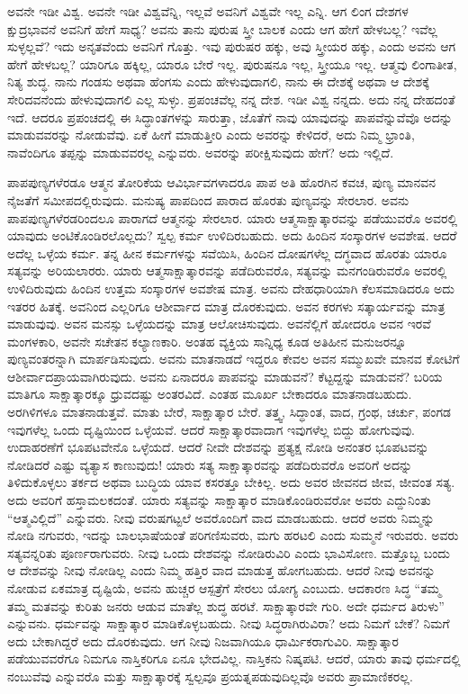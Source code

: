 ಅವನೇ ಇಡೀ ವಿಶ್ವ. ಅವನೇ ಇಡೀ ವಿಶ್ವವೆನ್ನಿ, ಇಲ್ಲವೆ ಅವನಿಗೆ ವಿಶ್ವವೇ ಇಲ್ಲ ಎನ್ನಿ. ಆಗ ಲಿಂಗ ದೇಶಗಳ ಕ್ಷುದ್ರಭಾವನೆ ಅವನಿಗೆ ಹೇಗೆ ಸಾಧ್ಯ? ಅವನು ತಾನು ಪುರುಷ ಸ್ತ್ರೀ ಬಾಲಕ ಎಂದು ಆಗ ಹೇಗೆ ಹೇಳಬಲ್ಲ? ಇವೆಲ್ಲ ಸುಳ್ಳಲ್ಲವೆ? ಇದು ಅನೃತವೆಂದು ಅವನಿಗೆ ಗೊತ್ತು. ಇವು ಪುರುಷರ ಹಕ್ಕು, ಅವು ಸ್ತ್ರೀಯರ ಹಕ್ಕು, ಎಂದು ಅವನು ಆಗ ಹೇಗೆ ಹೇಳಬಲ್ಲ? ಯಾರಿಗೂ ಹಕ್ಕಿಲ್ಲ, ಯಾರೂ ಬೇರೆ ಇಲ್ಲ. ಪುರುಷನೂ ಇಲ್ಲ, ಸ್ತ್ರೀಯೂ ಇಲ್ಲ. ಆತ್ಮವು ಲಿಂಗಾತೀತ, ನಿತ್ಯ ಶುದ್ಧ. ನಾನು ಗಂಡಸು ಅಥವಾ ಹೆಂಗಸು ಎಂದು ಹೇಳುವುದಾಗಲಿ, ನಾನು ಈ ದೇಶಕ್ಕೆ ಅಥವಾ ಆ ದೇಶಕ್ಕೆ ಸೇರಿದವನೆಂದು ಹೇಳುವುದಾಗಲಿ ಎಲ್ಲ ಸುಳ್ಳು. ಪ್ರಪಂಚವೆಲ್ಲ ನನ್ನ ದೇಶ. ಇಡೀ ವಿಶ್ವ ನನ್ನದು. ಅದು ನನ್ನ ದೇಹದಂತೆ ಇದೆ. ಆದರೂ ಪ್ರಪಂಚದಲ್ಲಿ ಈ ಸಿದ್ಧಾಂತಗಳನ್ನು ಸಾರುತ್ತಾ, ಜೊತೆಗೆ ನಾವು ಯಾವುದನ್ನು ಪಾಪವೆನ್ನುವೆವೊ ಅದನ್ನು ಮಾಡುವವರನ್ನು ನೋಡುವೆವು. ಏಕೆ ಹೀಗೆ ಮಾಡುತ್ತೀರಿ ಎಂದು ಅವರನ್ನು ಕೇಳಿದರೆ, ಅದು ನಿಮ್ಮ ಭ್ರಾಂತಿ, ನಾವೆಂದಿಗೂ ತಪ್ಪನ್ನು ಮಾಡುವವರಲ್ಲ ಎನ್ನುವರು. ಅವರನ್ನು ಪರೀಕ್ಷಿಸುವುದು ಹೇಗೆ? ಅದು ಇಲ್ಲಿದೆ.

ಪಾಪಪುಣ್ಯಗಳೆರಡೂ ಆತ್ಮನ ತೋರಿಕೆಯ ಆವಿರ್ಭಾವಗಳಾದರೂ ಪಾಪ ಅತಿ ಹೊರಗಿನ ಕವಚ, ಪುಣ್ಯ ಮಾನವನ ನೈಜತೆಗೆ ಸಮೀಪದಲ್ಲಿರುವುದು. ಮನುಷ್ಯ ಪಾಪದಿಂದ ಪಾರಾದ ಹೊರತು ಪುಣ್ಯವನ್ನು ಸೇರಲಾರ. ಅವನು ಪಾಪಪುಣ್ಯಗಳೆರಡರಿಂದಲೂ ಪಾರಾಗದೆ ಆತ್ಮನನ್ನು ಸೇರಲಾರ. ಯಾರು ಆತ್ಮಸಾಕ್ಷಾತ್ಕಾರವನ್ನು ಪಡೆಯುವರೊ ಅವರಲ್ಲಿ ಯಾವುದು ಅಂಟಿಕೊಂಡಿರಲೊಲ್ಲದು? ಸ್ವಲ್ಪ ಕರ್ಮ ಉಳಿದಿರಬಹುದು. ಅದು ಹಿಂದಿನ ಸಂಸ್ಕಾರಗಳ ಅವಶೇಷ. ಆದರೆ ಅದೆಲ್ಲ ಒಳ್ಳೆಯ ಕರ್ಮ. ತನ್ನ ಹೀನ ಕರ್ಮಗಳನ್ನು ಸವೆಯಿಸಿ, ಹಿಂದಿನ ದೋಷಗಳೆಲ್ಲ ದಗ್ಧವಾದ ಹೊರತು ಯಾರೂ ಸತ್ಯವನ್ನು ಅರಿಯಲಾರರು. ಯಾರು ಆತ್ಮಸಾಕ್ಷಾತ್ಕಾರವನ್ನು ಪಡೆದಿರುವರೊ, ಸತ್ಯವನ್ನು ಮನಗಂಡಿರುವರೊ ಅವರಲ್ಲಿ ಉಳಿದಿರುವುದು ಹಿಂದಿನ ಉತ್ತಮ ಸಂಸ್ಕಾರಗಳ ಅವಶೇಷ ಮಾತ್ರ. ಅವನು ದೇಹಧಾರಿಯಾಗಿ ಕೆಲಸಮಾಡಿದರೂ ಅದು ಇತರರ ಹಿತಕ್ಕೆ. ಅವನಿಂದ ಎಲ್ಲರಿಗೂ ಆಶೀರ್ವಾದ ಮಾತ್ರ ದೊರಕುವುದು. ಅವನ ಕರಗಳು ಸತ್ಕಾರ್ಯವನ್ನು ಮಾತ್ರ ಮಾಡುವುವು. ಅವನ ಮನಸ್ಸು ಒಳ್ಳೆಯದನ್ನು ಮಾತ್ರ ಆಲೋಚಿಸುವುದು. ಅವನೆಲ್ಲಿಗೆ ಹೋದರೂ ಅವನ ಇರವೆ ಮಂಗಳಕಾರಿ, ಅವನೇ ಸಚೇತನ ಕಲ್ಯಾಣಕಾರಿ. ಅಂತಹ ವ್ಯಕ್ತಿಯ ಸಾನ್ನಿಧ್ಯ ಕೂಡ ಅತಿಹೀನ ಮನುಜರನ್ನೂ ಪುಣ್ಯವಂತರನ್ನಾಗಿ ಮಾರ್ಪಡಿಸುವುದು. ಅವನು ಮಾತನಾಡದೆ ಇದ್ದರೂ ಕೇವಲ ಅವನ ಸಮ್ಮುಖವೇ ಮಾನವ ಕೋಟಿಗೆ ಆಶೀರ್ವಾದಪ್ರಾಯವಾಗಿರುವುದು. ಅವನು ಏನಾದರೂ ಪಾಪವನ್ನು ಮಾಡುವನೆ? ಕೆಟ್ಟದ್ದನ್ನು ಮಾಡುವನೆ? ಬರಿಯ ಮಾತಿಗೂ ಸಾಕ್ಷಾತ್ಕಾರಕ್ಕೂ ಧ್ರುವದಷ್ಟು ಅಂತರವಿದೆ. ಎಂತಹ ಮೂರ್ಖ ಬೇಕಾದರೂ ಮಾತನಾಡಬಹುದು. ಅರಗಿಳಿಗಳೂ ಮಾತನಾಡುತ್ತವೆ. ಮಾತು ಬೇರೆ, ಸಾಕ್ಷಾತ್ಕಾರ ಬೇರೆ. ತತ್ತ್ವ, ಸಿದ್ಧಾಂತ, ವಾದ, ಗ್ರಂಥ, ಚರ್ಚು, ಪಂಗಡ ಇವುಗಳೆಲ್ಲ ಒಂದು ದೃಷ್ಟಿಯಿಂದ ಒಳ್ಳೆಯವೆ. ಆದರೆ ಸಾಕ್ಷಾತ್ಕಾರವಾದಾಗ ಇವುಗಳೆಲ್ಲ ಬಿದ್ದು ಹೋಗುವುವು. ಉದಾಹರಣೆಗೆ ಭೂಪಟವೇನೊ ಒಳ್ಳೆಯದೆ. ಆದರೆ ನೀವೇ ದೇಶವನ್ನು ಪ್ರತ್ಯಕ್ಷ ನೋಡಿ ಅನಂತರ ಭೂಪಟವನ್ನು ನೋಡಿದರೆ ಎಷ್ಟು ವ್ಯತ್ಯಾಸ ಕಾಣುವುದು! ಯಾರು ಸತ್ಯ ಸಾಕ್ಷಾತ್ಕಾರವನ್ನು ಪಡೆದಿರುವರೊ ಅವರಿಗೆ ಅದನ್ನು ತಿಳಿದುಕೊಳ್ಳಲು ತರ್ಕದ ಅಥವಾ ಬುದ್ಧಿಯ ಯಾವ ಕಸರತ್ತೂ ಬೇಕಿಲ್ಲ. ಅದು ಅವರ ಜೀವನದ ಜೀವ, ಜೀವಂತ ಸತ್ಯ. ಅದು ಅವರಿಗೆ ಹಸ್ತಾಮಲಕದಂತೆ. ಯಾರು ಸತ್ಯವನ್ನು ಸಾಕ್ಷಾತ್ಕಾರ ಮಾಡಿಕೊಂಡಿರುವರೋ ಅವರು ಎದ್ದುನಿಂತು “ಆತ್ಮವಿಲ್ಲಿದೆ” ಎನ್ನುವರು. ನೀವು ವರುಷಗಟ್ಟಲೆ ಅವರೊಂದಿಗೆ ವಾದ ಮಾಡಬಹುದು. ಆದರೆ ಅವರು ನಿಮ್ಮನ್ನು ನೋಡಿ ನಗುವರು, ಇದನ್ನು ಬಾಲಭಾಷೆಯಂತೆ ಪರಿಗಣಿಸುವರು, ಮಗು ಹರಟಲಿ ಎಂದು ಸುಮ್ಮನೆ ಇರುವರು. ಅವರು ಸತ್ಯವನ್ನರಿತು ಪೂರ್ಣರಾಗುವರು. ನೀವು ಒಂದು ದೇಶವನ್ನು ನೋಡಿರುವಿರಿ ಎಂದು ಭಾವಿಸೋಣ. ಮತ್ತೊಬ್ಬ ಬಂದು ಆ ದೇಶವನ್ನು ನೀವು ನೋಡಿಲ್ಲ ಎಂದು ನಿಮ್ಮ ಹತ್ತಿರ ವಾದ ಮಾಡುತ್ತ ಹೋಗಬಹುದು. ಆದರೆ ನೀವು ಅವನನ್ನು ನೋಡುವ ಏಕಮಾತ್ರ ದೃಷ್ಟಿಯೆ, ಅವನು ಹುಚ್ಚರ ಆಸ್ಪತ್ರೆಗೆ ಸೇರಲು ಯೋಗ್ಯ ಎಂಬುದು. ಆದಕಾರಣ ಸಿದ್ಧ “ತಮ್ಮ ತಮ್ಮ ಮತವನ್ನು ಕುರಿತು ಜನರು ಆಡುವ ಮಾತೆಲ್ಲ ಶುದ್ಧ ಹರಟೆ. ಸಾಕ್ಷಾತ್ಕಾರವೇ ಗುರಿ. ಅದೇ ಧರ್ಮದ ತಿರುಳು” ಎನ್ನುವನು. ಧರ್ಮವನ್ನು ಸಾಕ್ಷಾತ್ಕಾರ ಮಾಡಿಕೊಳ್ಳಬಹುದು. ನೀವು ಸಿದ್ಧರಾಗಿರುವಿರಾ? ಅದು ನಿಮಗೆ ಬೇಕೆ? ನಿಮಗೆ ಅದು ಬೇಕಾಗಿದ್ದರೆ ಅದು ದೊರಕುವುದು. ಆಗ ನೀವು ನಿಜವಾಗಿಯೂ ಧಾರ್ಮಿಕರಾಗುವಿರಿ. ಸಾಕ್ಷಾತ್ಕಾರ ಪಡೆಯುವವರೆಗೂ ನಿಮಗೂ ನಾಸ್ತಿಕರಿಗೂ ಏನೂ ಭೇದವಿಲ್ಲ. ನಾಸ್ತಿಕನು ನಿಷ್ಕಪಟಿ. ಆದರೆ, ಯಾರು ತಾವು ಧರ್ಮದಲ್ಲಿ ನಂಬುವೆವು ಎನ್ನುವರೊ ಮತ್ತು ಸಾಕ್ಷಾತ್ಕಾರಕ್ಕೆ ಸ್ವಲ್ಪವೂ ಪ್ರಯತ್ನಪಡುವುದಿಲ್ಲವೊ ಅವರು ಪ್ರಾಮಾಣಿಕರಲ್ಲ.

